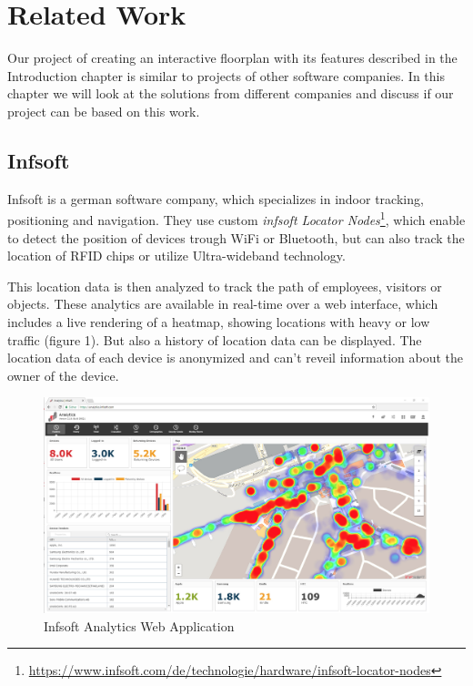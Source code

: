 \section{Related Work}

Our project of creating an interactive floorplan with its features described in the Introduction chapter is similar to projects of other software companies. In this chapter we will look at the solutions from different companies and discuss if our project can be based on this work.

\subsection{Infsoft}

Infsoft is a german software company, which specializes in indoor tracking, positioning and navigation. They use custom \emph{infsoft Locator Nodes}\footnote{\url{https://www.infsoft.com/de/technologie/hardware/infsoft-locator-nodes}}, which enable to detect the position of devices trough WiFi or Bluetooth, but can also track the location of RFID chips or utilize Ultra-wideband technology.

This location data is then analyzed to track the path of employees, visitors or objects. These analytics are available in real-time over a web interface, which includes a live rendering of a heatmap, showing locations with heavy or low traffic (figure 1). But also a history of location data can be displayed. The location data of each device is anonymized and can't reveil information about the owner of the device. 

\begin{figure}[!hb]
	\centering
	\includegraphics[width=0.9\linewidth]{images/Infsoft}
	\caption{Infsoft Analytics Web Application}
	\label{fig:InfsoftApplication}
\end{figure}

